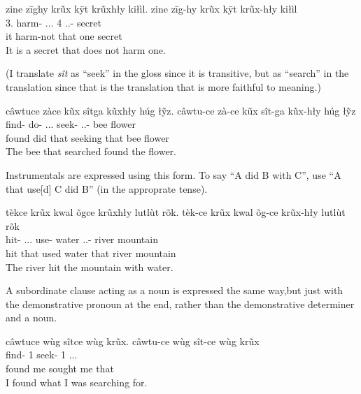 \documentclass[12pt]{article}
\begin{document}
    \begin{exe}
        \ex
        \glt
        zine zīghy krũx kȳt krũxhły kiłìl.
        \glll
        zine zīg-hy krũx kȳt krũx-hły kiłìl \\
        3\Sg{}.\Inanim{} harm-\Neg{} \Dem.\Dist{}.\Inanim{}.\Sg{} 4\Sg{} \Dem.\Dist{}.\Inanim{}-\Adj{} secret \\
        it harm-not that one secret \\
        \glt
        It is a secret that does not harm one.
    \end{exe}

    (I translate \textit{sît} as ``seek'' in the gloss since it is transitive,
    but as ``search'' in the translation since that is the translation
    that is more faithful to meaning.)
    \begin{exe}
        \ex
        \glt
        câwtuce zàce kũx sîtga kũxhły húg łỹz.
        \glll
        câwtu-ce zà-ce kũx sît-ga kũx-hły húg łỹz \\
        find-\Pst{} do-\Pst{} \Dem{}.\Dist{}.\Anim{}.\Sg{} seek-\Ger{} \Dem{}.\Dist{}.\Anim{}-\Adj{} bee flower \\
        found did that seeking that bee flower \\
        \glt
        The bee that searched found the flower.
    \end{exe}

    Instrumentals are expressed using this form.
    To say ``A did B with C'',
    use ``A that use[d] C did B'' (in the approprate tense).

    \begin{exe}
        \ex
        \glt
        tèkce krũx kwal õgce krũxhły lutlùt rõk.
        \glll
        tèk-ce krũx kwal õg-ce krũx-hły lutlùt rõk \\
        hit-\Pst{} \Dem{}.\Dist{}.\Inanim{}.\Sg{} use-\Pst{} water \Dem{}.\Dist{}.\Inanim{}-\Adj{} river mountain \\
        hit that used water that river mountain \\
        \glt
        The river hit the mountain with water.
    \end{exe}

    A subordinate clause acting as a noun
    is expressed the same way,but just with the demonstrative pronoun
    at the end, rather than the demonstrative determiner and a noun.

    \begin{exe}
        \ex
        câwtuce wùg sîtce wùg krũx.
        \glll
        câwtu-ce wùg sît-ce wùg krũx \\
        find-\Pst{} 1\Sg{} seek-\Pst{} 1\Sg{} \Dem{}.\Inanim{}.\Dist{}.\Sg{} \\
        found me sought me that  \\
        \glt
        I found what I was searching for.
    \end{exe}
\end{document}
